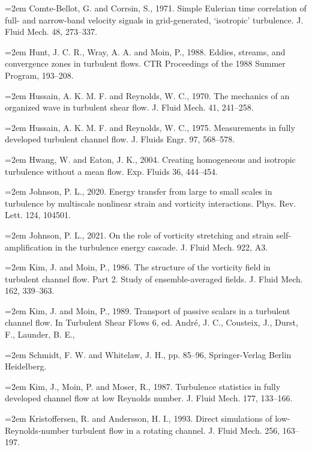 \documentclass[12pt,a4paper,openany,fontset=none]{ctexbook}
\begin{document}
\par\hangindent=2em Comte-Bellot, G. and Corrsin, S., 1971. Simple Eulerian time correlation of full- and narrow-band velocity signals in grid-generated, ‘isotropic’ turbulence. J. Fluid Mech. 48, 273–337.
\par\hangindent=2em Hunt, J. C. R., Wray, A. A. and Moin, P., 1988. Eddies, streams, and convergence zones in turbulent flows. CTR Proceedings of the 1988 Summer Program, 193–208.
\par\hangindent=2em Hussain, A. K. M. F. and Reynolds, W. C., 1970. The mechanics of an organized wave in turbulent shear flow. J. Fluid Mech. 41, 241–258.
\par\hangindent=2em Hussain, A. K. M. F. and Reynolds, W. C., 1975. Measurements in fully developed turbulent channel flow. J. Fluids Engr. 97, 568–578.
\par\hangindent=2em Hwang, W. and Eaton, J. K., 2004. Creating homogeneous and isotropic turbulence without a mean flow. Exp. Fluids 36, 444–454.
\par\hangindent=2em Johnson, P. L., 2020. Energy transfer from large to small scales in turbulence by multiscale nonlinear strain and vorticity interactions. Phys. Rev. Lett. 124, 104501.
\par\hangindent=2em Johnson, P. L., 2021. On the role of vorticity stretching and strain self-amplification in the turbulence energy cascade. J. Fluid Mech. 922, A3.
\par\hangindent=2em Kim, J. and Moin, P., 1986. The structure of the vorticity field in turbulent channel flow. Part 2. Study of ensemble-averaged fields. J. Fluid Mech. 162, 339–363.
\par\hangindent=2em Kim, J. and Moin, P., 1989. Transport of passive scalars in a turbulent channel flow. In Turbulent Shear Flows 6, ed. André, J. C., Cousteix, J., Durst, F., Launder, B. E.,
\par\hangindent=2em Schmidt, F. W. and Whitelaw, J. H., pp. 85–96, Springer-Verlag Berlin Heidelberg.
\par\hangindent=2em Kim, J., Moin, P. and Moser, R., 1987. Turbulence statistics in fully developed channel flow at low Reynolds number. J. Fluid Mech. 177, 133–166.
\par\hangindent=2em Kristoffersen, R. and Andersson, H. I., 1993. Direct simulations of low-Reynolds-number turbulent flow in a rotating channel. J. Fluid Mech. 256, 163–197.
\end{document}
